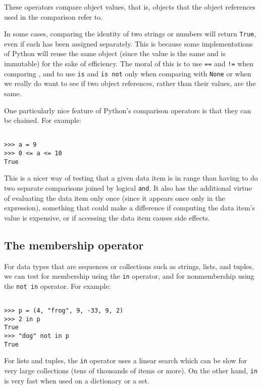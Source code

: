 These operators compare object values, that is, objects that the object references used in the comparison refer to.


In some cases, comparing the identity of two strings or numbers will return \verb|True|, even if each has been assigned separately.
This is because some implementations of Python will reuse the same object (since the value is the same and is immutable) for the sake of efficiency.
The moral of this is to use \verb|==| and \verb|!=| when comparing , and to use \verb|is| and \verb|is not| only when comparing with \verb|None| or when we really do want to see if two object references, rather than their values, are the same.



One particularly nice feature of Python’s comparison operators is that they can be chained.
For example:
\begin{lstlisting}

>>> a = 9
>>> 0 <= a <= 10
True
\end{lstlisting}



This is a nicer way of testing that a given data item is in range than having to do two separate comparisons joined by logical \verb|and|.
It also has the additional virtue of evaluating the data item only once (since it appears once only in the expression), something that could make a difference if computing the data item's value is expensive, or if accessing the data item causes side effects.


\subsection{The membership operator}

For data types that are sequences or collections such as strings, lists, and tuples, we can test for membership using the \verb|in| operator, and for nonmembership using the \verb|not in| operator. For example:
\begin{lstlisting}

>>> p = (4, "frog", 9, -33, 9, 2) 
>>> 2 in p
True
>>> "dog" not in p
True
\end{lstlisting}



For lists and tuples, the \verb|in| operator uses a linear search which can be slow for very large collections (tens of thousands of items or more).
On the other hand, \verb|in| is very fast when used on a dictionary or a set.



